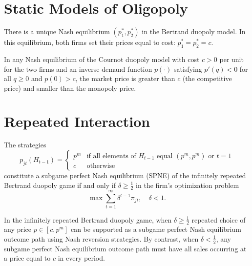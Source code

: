 \addtocounter{section}{1}

\addtocounter{section}{1}


\section{Static Models of Oligopoly}

\begin{prop}
    There is a unique Nash equilibrium $(p^*_1, p^*_2)$ in the Bertrand duopoly model. In this equilibrium, both firms set their prices equal to cost: $p^*_1 = p^*_2 = c$.
\end{prop}

\begin{prop}
    In any Nash equilibrium of the Cournot duopoly model with cost $c > 0$ per unit for the two firms and an inverse demand function $p(\cdot)$ satisfying $p'(q) < 0$ for all $q \geq 0$ and $p(0) > c$, the market price is greater than $c$ (the competitive price) and smaller than the monopoly price.
\end{prop}


\section{Repeated Interaction}

\begin{prop}
    The strategies
    \begin{equation*}
        p_{jt} (H_{t - 1}) = \begin{cases}
            p^m &\text{if all elements of $H_{t - 1}$ equal $(p^m, p^m)$ or $t = 1$} \\
            c &\text{otherwise}
        \end{cases}
    \end{equation*}
    constitute a subgame perfect Nash equilibrium (SPNE) of the infinitely repeated Bertrand duopoly game if and only if $\delta \geq \frac{1}{2}$ in the firm's optimization problem
    \begin{equation*}
        \max \sum_{t = 1}^\infty \delta^{t - 1} \pi_{jt}, \quad \delta < 1.
    \end{equation*}
\end{prop}

\begin{prop}
    In the infinitely repeated Bertrand duopoly game, when $\delta \geq \frac{1}{2}$ repeated choice of any price $p \in [c, p^m]$ can be supported as a subgame perfect Nash equilibrium outcome path using Nash reversion strategies. By contrast, when $\delta < \frac{1}{2}$, any subgame perfect Nash equilibrium outcome path must have all sales occurring at a price equal to $c$ in every period.
\end{prop}


